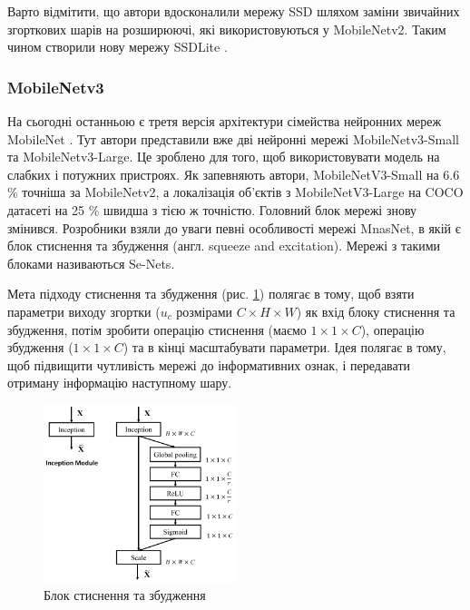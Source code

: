 Варто відмітити, що автори вдосконалили мережу SSD \cite{ssd} шляхом заміни 
звичайних згорткових шарів на розширюючі, які 
використовуються у MobileNetv2. Таким чином створили нову мережу SSDLite \cite{mobilenetv2}.

\subsubsection{MobileNetv3}

На сьогодні останньою є третя версія архітектури сімейства нейронних мереж MobileNet \cite{mobilenetv3}.
Тут автори представили вже дві нейронні мережі MobileNetv3-Small та MobileNetv3-Large.
Це зроблено для того, щоб використовувати модель на слабких і потужних пристроях.
Як запевняють автори, MobileNetV3-Small на 6.6 \% точніша за MobileNetv2, а локалізація об'єктів
з MobileNetV3-Large на COCO датасеті на 25 \% швидша з тією  ж точністю.
Головний блок мережі знову змінився. Розробники взяли
до уваги певні особливості мережі MnasNet, в якій є блок стиснення та збудження
(англ. squeeze and excitation). Мережі з такими блоками називаються Se-Nets.

Мета підходу стиснення та збудження (рис. \ref{fig:cnn:senet_block}) полягає в тому, щоб взяти параметри 
виходу згортки ($u_c$ розмірами $C \times H \times W$)
як вхід блоку стиснення та збудження,
потім зробити операцію стиснення (маємо $1 \times 1 \times C$), операцію збудження ($1 \times 1 \times C$) та 
в кінці масштабувати параметри.
Ідея полягає в тому, щоб підвищити чутливість мережі до інформативних ознак,
і передавати отриману інформацію наступному шару.

\begin{figure}[H]
    \centering
    \includegraphics[width=0.5\textwidth]{images/cnn_senet_block}
    \caption{Блок стиснення та збудження      \cite{squeeze_and_excitation_website}
        \label{fig:cnn:senet_block}
    }
\end{figure}

